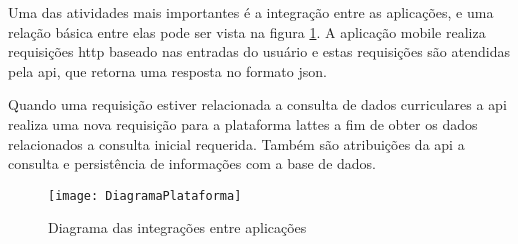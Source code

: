 Uma das atividades mais importantes é a integração entre as aplicações, e uma relação básica entre elas pode ser vista na figura \ref{fig:diagrama}. A aplicação mobile realiza requisições \gls{http} baseado nas entradas do usuário e estas requisições são atendidas pela \gls{api}, que retorna uma resposta no formato \gls{json}.

Quando uma requisição estiver relacionada a consulta de dados curriculares a \gls{api} realiza uma nova requisição para a plataforma lattes a fim de obter os dados relacionados a consulta inicial requerida. Também são atribuições da \gls{api} a consulta e persistência de informações com a base de dados.

\begin{figure}[htb]
    \caption{Diagrama das integrações entre aplicações}
    \texttt{[image: DiagramaPlataforma]}
    \label{fig:diagrama}
\end{figure}